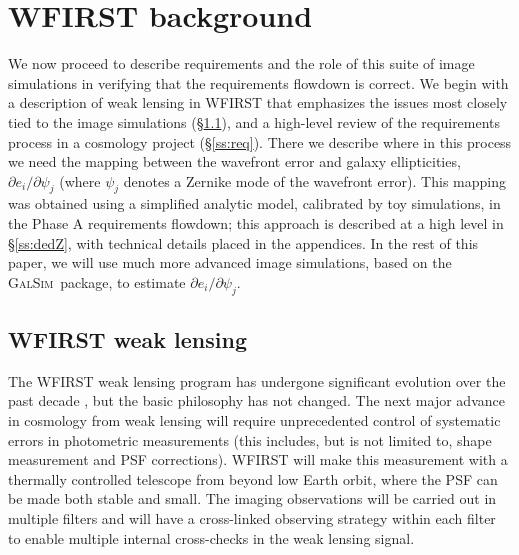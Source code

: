 \documentclass[usenatbib]{mnras}
\newcommand{\galsim}{\textsc{GalSim}}
\begin{document}
\section{WFIRST background}
\label{sec:wfirst}

We now proceed to describe requirements and the role of this suite of image simulations in verifying that the requirements flowdown is correct. We begin with a description of weak lensing in WFIRST that emphasizes the issues most closely tied to the image simulations (\S\ref{ss:wlprog}), and a high-level review of the requirements process in a cosmology project (\S\ref{ss:req}). There we describe where in this process we need the mapping between the wavefront error and galaxy ellipticities, $\partial e_i/\partial \psi_j$ (where $\psi_j$ denotes a Zernike mode of the wavefront error). This mapping was obtained using a simplified analytic model, calibrated by toy simulations, in the Phase A requirements flowdown; this approach is described at a high level in \S\ref{ss:dedZ}, with technical details placed in the appendices. In the rest of this paper, we will use much more advanced image simulations, based on the \galsim\ package, to estimate $\partial e_i/\partial \psi_j$.

\subsection{WFIRST weak lensing}
\label{ss:wlprog}

The WFIRST weak lensing program has undergone significant evolution over the past decade \citep{2011arXiv1108.1374G, 2012arXiv1208.4012G, 2013arXiv1305.5422S, 2015arXiv150303757S, 2018arXiv180403628D, 2019arXiv190205569A}, but the basic philosophy has not changed. The next major advance in cosmology from weak lensing will require unprecedented control of systematic errors in photometric measurements (this includes, but is not limited to, shape measurement and PSF corrections). WFIRST will make this measurement with a thermally controlled telescope from beyond low Earth orbit, where the PSF can be made both stable and small. The imaging observations will be carried out in multiple filters and will have a cross-linked observing strategy within each filter to enable multiple internal cross-checks in the weak lensing signal.
\end{document}
